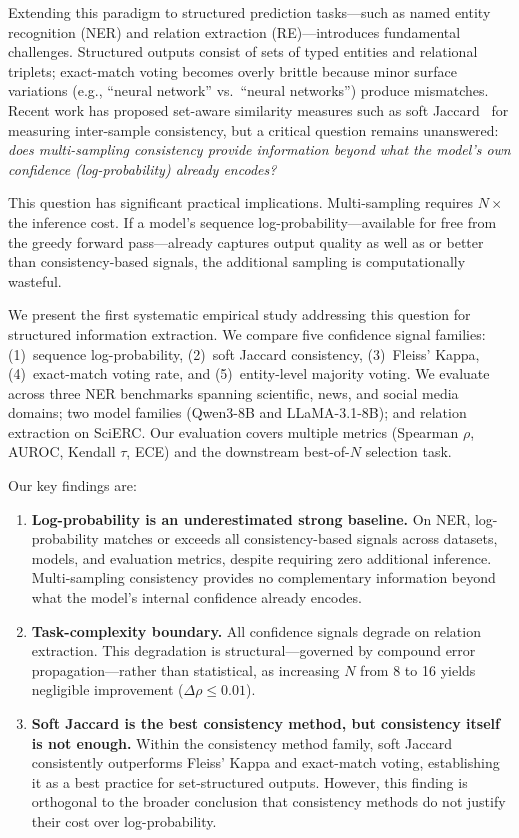 \documentclass[11pt,a4paper]{article}
\begin{document}
Extending this paradigm to structured prediction tasks---such as named entity recognition (NER) and relation extraction (RE)---introduces fundamental challenges. Structured outputs consist of sets of typed entities and relational triplets; exact-match voting becomes overly brittle because minor surface variations (e.g., ``neural network'' vs.\ ``neural networks'') produce mismatches. Recent work has proposed set-aware similarity measures such as soft Jaccard~\cite{chen2024usc} for measuring inter-sample consistency, but a critical question remains unanswered: \emph{does multi-sampling consistency provide information beyond what the model's own confidence (log-probability) already encodes?}

This question has significant practical implications. Multi-sampling requires $N\times$ the inference cost. If a model's sequence log-probability---available for free from the greedy forward pass---already captures output quality as well as or better than consistency-based signals, the additional sampling is computationally wasteful.

We present the first systematic empirical study addressing this question for structured information extraction. We compare five confidence signal families: (1)~sequence log-probability, (2)~soft Jaccard consistency, (3)~Fleiss' Kappa, (4)~exact-match voting rate, and (5)~entity-level majority voting. We evaluate across three NER benchmarks spanning scientific, news, and social media domains; two model families (Qwen3-8B and LLaMA-3.1-8B); and relation extraction on SciERC. Our evaluation covers multiple metrics (Spearman $\rho$, AUROC, Kendall $\tau$, ECE) and the downstream best-of-$N$ selection task.

Our key findings are:
\begin{enumerate}
    \item \textbf{Log-probability is an underestimated strong baseline.} On NER, log-probability matches or exceeds all consistency-based signals across datasets, models, and evaluation metrics, despite requiring zero additional inference. Multi-sampling consistency provides no complementary information beyond what the model's internal confidence already encodes.
    \item \textbf{Task-complexity boundary.} All confidence signals degrade on relation extraction. This degradation is structural---governed by compound error propagation---rather than statistical, as increasing $N$ from 8 to 16 yields negligible improvement ($\Delta\rho\leq0.01$).
    \item \textbf{Soft Jaccard is the best consistency method, but consistency itself is not enough.} Within the consistency method family, soft Jaccard consistently outperforms Fleiss' Kappa and exact-match voting, establishing it as a best practice for set-structured outputs. However, this finding is orthogonal to the broader conclusion that consistency methods do not justify their cost over log-probability.
\end{enumerate}
\end{document}
